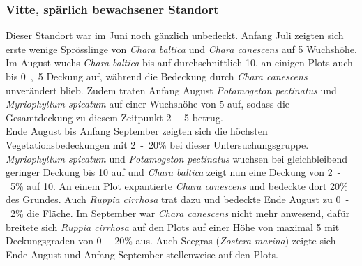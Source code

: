 \subsubsection{Vitte, spärlich bewachsener Standort}


Dieser Standort war im Juni noch gänzlich unbedeckt. Anfang Juli zeigten sich erste wenige Sprösslinge von \textit{Chara baltica} und \textit{Chara canescens} auf \unit{5}{\centi\metre} Wuchshöhe. Im August wuchs \textit{Chara baltica} bis auf durchschnittlich \unit{10}{\centi\metre}, an einigen Plots auch bis \unit{0,5}{\centi\metre} Deckung auf, während die Bedeckung durch \textit{Chara canescens} unverändert blieb. Zudem traten Anfang August \textit{Potamogeton pectinatus} und \textit{Myriophyllum spicatum} auf einer Wuchshöhe von \unit{5}{\centi\metre} auf, sodass die Gesamtdeckung zu diesem Zeitpunkt \unit{2-5}{\prozent} betrug. \\
Ende August bis Anfang September zeigten sich die höchsten Vegetationsbedeckungen mit \unit{2-20}{\%} bei dieser Untersuchungsgruppe. \textit{Myriophyllum spicatum} und \textit{Potamogeton pectinatus} wuchsen bei gleichbleibend geringer Deckung bis \unit{10}{\centi\metre} auf und \textit{Chara baltica} zeigt nun eine Deckung von \unit{2-5}{\%} auf \unit{10}{\centi\metre}. An einem Plot expantierte \textit{Chara canescens} und bedeckte dort \unit{20}{\%} des Grundes. Auch \textit{Ruppia cirrhosa} trat dazu und bedeckte Ende August zu \unit{0-2}{\%} die Fläche. Im September war \textit{Chara canescens} nicht mehr anwesend, dafür breitete sich \textit{Ruppia cirrhosa} auf den Plots auf einer Höhe von maximal \unit{5}{\centi\metre} mit Deckungsgraden von \unit{0-20}{\%} aus. Auch Seegras (\textit{Zostera marina}) zeigte sich Ende August und Anfang September stellenweise auf den Plots.

